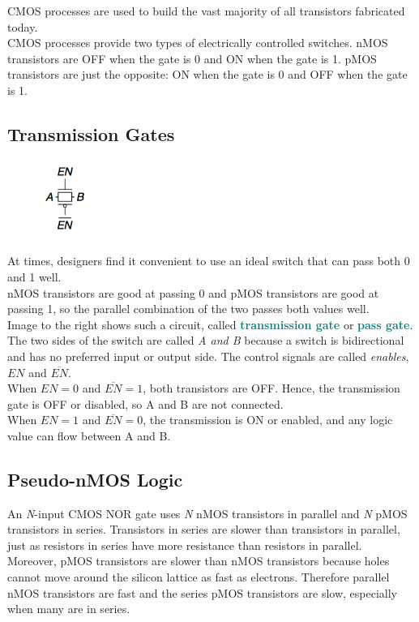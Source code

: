 \documentclass[12pt]{article}
\theoremstyle{definition}
\newcommand{\defnterm}[1]{\textbf{\textcolor{teal}{#1}}\index{#1}}
\begin{document}
  CMOS processes are used to build the vast majority of all transistors fabricated today. \\
  CMOS processes provide two types of electrically controlled switches.
  nMOS transistors are OFF when the gate is 0 and ON when the gate is 1.
  pMOS transistors are just the opposite: ON when the gate is 0 and OFF when the gate is 1.

  \subsection{Transmission Gates}
  \begin{figure}
    \centering
    \includegraphics[width=0.15\textwidth]{pictures/transmissionGate.png}
  \end{figure}
  At times, designers find it convenient to use an ideal switch that can pass both 0 and 1 well. \\
  nMOS transistors are good at passing 0 and pMOS transistors are good at passing 1, so the parallel combination of the two passes both values well. \\
  Image to the right shows such a circuit, called \defnterm{transmission gate} or \defnterm{pass gate}. \\
  The two sides of the switch are called \emph{A \emph{and} B} because a switch is bidirectional and has no preferred input or output side.
  The control signals are called \emph{enables}, $EN$ and $\overline{EN}$. \\
  When $EN = 0$ and $\overline{EN} = 1$, both transistors are OFF.
  Hence, the transmission gate is OFF or disabled, so A and B are not connected. \\
  When $EN = 1$ and $\overline{EN} = 0$, the transmission is ON or enabled, and any logic value can flow between A and B.

  \subsection{Pseudo-nMOS Logic}
  An \emph{N}-input CMOS NOR gate uses \emph{N} nMOS transistors in parallel and \emph{N} pMOS transistors in series.
  Transistors in series are slower than transistors in parallel, just as resistors in series have more resistance than resistors in parallel. \\
  Moreover, pMOS transistors are slower than nMOS transistors because holes cannot move around the silicon lattice as fast as electrons.
  Therefore parallel nMOS transistors are fast and the series pMOS transistors are slow, especially when many are in series. \\
\end{document}
